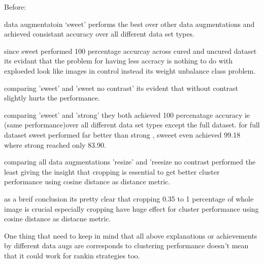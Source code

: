 Before: 

data augmentatoin ‘sweet’ performs the best over other data augmentations and achieved consistant accuracy over all different data set types. 

since sweet performed 100 percentage accurcay across cured and uncured dataset its evidant that the problem for having less accracy is nothing
 to do with exploeded look like images in control instead its weight unbalance class problem. 

 comparing 'sweet' and 'sweet no contrast' its evident that without contrast slightly hurts the performance.

comparing 'sweet' and 'strong' they both achieved 100 percenatage accuracy ie (same performance)over all different data set types except the full dataset.
for full dataset sweet performed far better than strong , sweeet even achieved 99.18 where strong reached only 83.90.

comparing all data augmentations 'resize' and 'reesize no contrast performed the least giving the insight that cropping is essential to get better cluster performance
 using cosine distance as distance metric.

 as a breif conclusion its pretty clear that cropping 0.35 to 1 percentage of whole image is crucial especially cropping have huge effect for cluster performance using cosine distance as distacne metric.

 One thing that need to keep in mind that all above explanations or achievements by different data augs are corresponds to clustering performance doesn't mean that
  it could work for rankin strategies too.
    
